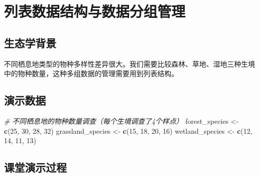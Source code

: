 \documentclass[
]{book}
\newenvironment{Shaded}{\begin{snugshade}}{\end{snugshade}}
\newcommand{\CommentTok}[1]{\textcolor[rgb]{0.56,0.35,0.01}{\textit{#1}}}
\newcommand{\DecValTok}[1]{\textcolor[rgb]{0.00,0.00,0.81}{#1}}
\newcommand{\FunctionTok}[1]{\textcolor[rgb]{0.13,0.29,0.53}{\textbf{#1}}}
\newcommand{\NormalTok}[1]{#1}
\newcommand{\OtherTok}[1]{\textcolor[rgb]{0.56,0.35,0.01}{#1}}
\begin{document}
\hypertarget{ux5217ux8868ux6570ux636eux7ed3ux6784ux4e0eux6570ux636eux5206ux7ec4ux7ba1ux7406}{%
\section{列表数据结构与数据分组管理}\label{ux5217ux8868ux6570ux636eux7ed3ux6784ux4e0eux6570ux636eux5206ux7ec4ux7ba1ux7406}}

\hypertarget{ux751fux6001ux5b66ux80ccux666f-3}{%
\subsection{生态学背景}\label{ux751fux6001ux5b66ux80ccux666f-3}}

不同栖息地类型的物种多样性差异很大。我们需要比较森林、草地、湿地三种生境中的物种数量，这种多组数据的管理需要用到列表结构。

\hypertarget{ux6f14ux793aux6570ux636e-3}{%
\subsection{演示数据}\label{ux6f14ux793aux6570ux636e-3}}

\begin{Shaded}
\begin{Highlighting}[]
\CommentTok{\# 不同栖息地的物种数量调查（每个生境调查了4个样点）}
\NormalTok{forest\_species }\OtherTok{\textless{}{-}} \FunctionTok{c}\NormalTok{(}\DecValTok{25}\NormalTok{, }\DecValTok{30}\NormalTok{, }\DecValTok{28}\NormalTok{, }\DecValTok{32}\NormalTok{)}
\NormalTok{grassland\_species }\OtherTok{\textless{}{-}} \FunctionTok{c}\NormalTok{(}\DecValTok{15}\NormalTok{, }\DecValTok{18}\NormalTok{, }\DecValTok{20}\NormalTok{, }\DecValTok{16}\NormalTok{)  }
\NormalTok{wetland\_species }\OtherTok{\textless{}{-}} \FunctionTok{c}\NormalTok{(}\DecValTok{12}\NormalTok{, }\DecValTok{14}\NormalTok{, }\DecValTok{11}\NormalTok{, }\DecValTok{13}\NormalTok{)}
\end{Highlighting}
\end{Shaded}

\hypertarget{ux8bfeux5802ux6f14ux793aux8fc7ux7a0b-3}{%
\subsection{课堂演示过程}\label{ux8bfeux5802ux6f14ux793aux8fc7ux7a0b-3}}
\end{document}
